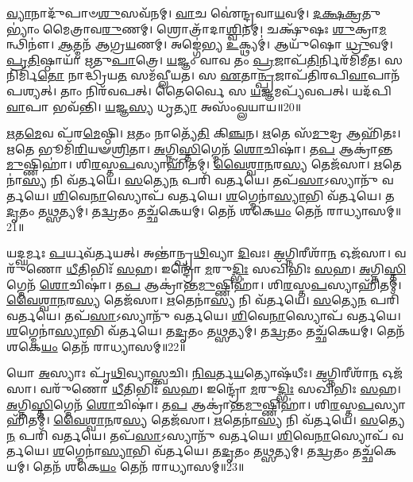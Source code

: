 \-\ul{𑌵𑍍𑌯𑌾}\-𑌨𑌾𑌦𑍁᳴𑌪𑌾𑍞\-\ul{𑌶𑍁}\-𑌸𑌵᳴𑌨𑌮𑍍।
\-\ul{𑌵𑌾}\-𑌚 𑌐॑𑌨𑍍𑌦𑍍𑌰𑌵𑌾\-\ul{𑌯}\-𑌵𑌮𑍍।
\-\ul{𑌦}\-\-\ul{𑌕𑍍𑌷}\-\-\ul{𑌕𑍍𑌰}\-𑌤𑍁𑌭𑍍𑌯𑌾𑌂॑ 𑌮𑍈𑌤𑍍𑌰𑌾𑌵\-\ul{𑌰𑍁}\-𑌣𑌮𑍍।
𑌶𑍍𑌰𑍋𑌤𑍍𑌰𑌾᳴𑌦𑌾\-\ul{𑌶𑍍𑌵𑌿}\-𑌨𑌮𑍍।
𑌚𑌕𑍍𑌷𑍁᳴𑌷𑌃 \ul{𑌶𑍁}\-𑌕𑍍𑌰𑌾\-\ul{𑌮}\-𑌨𑍍𑌥𑌿𑌨𑍗॑।
\-\ul{𑌆}\-𑌤𑍍𑌮𑌨᳴ 𑌆𑌗𑍍𑌰\-\ul{𑌯}\-𑌣𑌮𑍍।
𑌅𑌙𑍍𑌗𑍇॑𑌭𑍍𑌯 \ul{𑌉}\-𑌕𑍍𑌥𑍍𑌯𑌮𑍍॑।
𑌆𑌯𑍁᳴𑌷𑍋 \ul{𑌧𑍍𑌰𑍁}\-𑌵𑌮𑍍।
\-\ul{𑌪𑍍𑌰}\-\-\ul{𑌤𑌿}\-𑌷𑍍𑌠𑌾𑌯𑌾᳴ 𑌋𑌤𑍁\-\ul{𑌪𑌾}\-𑌤𑍍𑌰𑍇।
\-\ul{𑌯}\-𑌜𑍍𑌞𑌂 𑌵𑌾𑌵 𑌤𑌂 \ul{𑌪𑍍𑌰}\-𑌜𑌾𑌪᳴\-\ul{𑌤𑌿}\-𑌰𑍍𑌨𑌿𑌰᳴𑌮𑌿𑌮𑍀𑌤।
𑌸 𑌨𑌿𑌰𑍍𑌮𑌿᳴\-\ul{𑌤𑍋} 𑌨𑌾𑌦𑍍𑌧𑍍𑌰𑌿᳴𑌯\-\ul{𑌤} 𑌸𑌮᳴𑌵𑍍𑌲𑍀𑌯𑌤।
𑌸 \ul{𑌏}\-𑌤𑌾\-\ul{𑌨𑍍𑌪𑍍𑌰}\-𑌜𑌾𑌪᳴𑌤𑌿𑌰𑌪𑌿\-\ul{𑌵𑌾}\-𑌪𑌾𑌨᳴𑌪𑌶𑍍𑌯𑌤𑍍।
𑌤𑌾𑌂 𑌨𑌿𑌰᳴𑌵𑌪𑌤𑍍।
𑌤𑍈𑌰𑍍𑌵𑍈 𑌸 \ul{𑌯}\-𑌜𑍍𑌞𑌮𑌪𑍍𑌯᳴𑌵𑌪𑌤𑍍।
𑌯𑌦᳴𑌪𑌿\-\ul{𑌵𑌾}\-𑌪𑌾 𑌭𑌵᳴𑌨𑍍𑌤𑌿।
\-\ul{𑌯}\-𑌜𑍍𑌞\-\ul{𑌸𑍍𑌯} 𑌧𑍃\-\ul{𑌤𑍍𑌯𑌾} 𑌅𑌸𑌂᳴𑌵𑍍𑌲𑌯𑌾𑌯॥20॥\anuvakamend[\-\ul{𑌉}\-\-\ul{𑌪𑌾}\-\-\ul{𑍞}\-\-\ul{𑌶𑍍𑌵}\-\-\ul{𑌨𑍍𑌤}\-\-\ul{𑌰𑍍𑌯𑌾}\-𑌮𑍗 𑌨𑌿𑌰᳴𑌮𑌿𑌮𑍀𑌤𑌾𑌮𑌿𑌮𑍀\-\ul{𑌤} 𑌷𑌟𑍍𑌚᳴]

\-\ul{𑌋}\-𑌤\-\ul{𑌮𑍇}\-𑌵 𑌪᳴𑌰\-\ul{𑌮𑍇}\-𑌷𑍍𑌠𑌿।
\-\ul{𑌋}\-𑌤𑌂 𑌨𑌾𑌤𑍍𑌯𑍇᳴\-\ul{𑌤𑌿} 𑌕𑌿\-\ul{𑌞𑍍𑌚}\-𑌨।
\-\ul{𑌋}\-𑌤𑍇 𑌸᳴\-\ul{𑌮𑍁}\-𑌦𑍍𑌰 𑌆𑌹𑌿᳴𑌤𑌃।
\-\ul{𑌋}\-𑌤𑍇 𑌭𑍂𑌮𑌿᳴\-\ul{𑌰𑌿}\-𑌯𑍟\-\ul{𑌶𑍍𑌰𑌿}\-𑌤𑌾।
\-\ul{𑌅}\-𑌗𑍍𑌨𑌿\-\ul{𑌸𑍍𑌤𑌿}\-𑌗𑍍𑌮𑍇𑌨᳴ \ul{𑌶𑍋}\-𑌚𑌿𑌷𑌾॑।
𑌤\-\ul{𑌪} 𑌆𑌕𑍍𑌰𑌾॑𑌨𑍍𑌤\-\ul{𑌮𑍁}\-𑌷𑍍𑌣𑌿𑌹𑌾॑।
𑌶𑌿\-\ul{𑌰}\-𑌸𑍍𑌤\-\ul{𑌪}\-𑌸𑍍𑌯𑌾𑌹𑌿᳴𑌤𑌮𑍍।
\-\ul{𑌵𑍈}\-\-\ul{𑌶𑍍𑌵𑌾}\-\-\ul{𑌨}\-𑌰\-\ul{𑌸𑍍𑌯} 𑌤𑍇𑌜᳴𑌸𑌾।
\-\ul{𑌋}\-𑌤𑍇𑌨𑌾॑\-\ul{𑌸𑍍𑌯} 𑌨𑌿 𑌵᳴𑌰𑍍𑌤𑌯𑍇।
\-\ul{𑌸}\-𑌤𑍍𑌯𑍇\-\ul{𑌨} 𑌪𑌰𑌿᳴ 𑌵𑌰𑍍𑌤𑌯𑍇।
𑌤𑌪᳴\-\ul{𑌸𑌾}\-\-𑌽𑌸𑍍𑌯𑌾𑌨𑍁᳴ 𑌵𑌰𑍍𑌤𑌯𑍇।
\-\ul{𑌶𑌿}\-𑌵𑍇\-\ul{𑌨𑌾}\-𑌸𑍍𑌯𑍋𑌪᳴ 𑌵𑌰𑍍𑌤𑌯𑍇।
\-\ul{𑌶}\-𑌗𑍍𑌮𑍇𑌨𑌾॑\-\ul{𑌸𑍍𑌯𑌾}\-𑌭𑌿 𑌵᳴𑌰𑍍𑌤𑌯𑍇।
𑌤\-\ul{𑌦𑍃}\-𑌤𑌂 𑌤\-\ul{𑌥𑍍𑌸}\-𑌤𑍍𑌯𑌮𑍍।
𑌤\-\ul{𑌦𑍍𑌵𑍍𑌰}\-𑌤𑌂 𑌤𑌚𑍍𑌛᳴𑌕𑍇𑌯𑌮𑍍।
𑌤𑍇𑌨᳴ 𑌶𑌕𑍇\-\ul{𑌯𑌂} 𑌤𑍇𑌨᳴ 𑌰𑌾𑌧𑍍𑌯𑌾𑌸𑌮𑍍॥21॥

𑌯𑌦𑍍\mbox{}\-\ul{𑌘}\-𑌰𑍍𑌮𑌃 \ul{𑌪}\-𑌰𑍍𑌯𑌵᳴𑌰𑍍𑌤𑌯𑌤𑍍।
𑌅𑌨𑍍𑌤𑌾॑𑌨𑍍𑌪𑍃\-\ul{𑌥𑌿}\-𑌵𑍍𑌯𑌾 \ul{𑌦𑌿}\-𑌵𑌃।
\-\ul{𑌅}\-𑌗𑍍𑌨𑌿𑌰𑍀𑌶𑌾᳴\-\ul{𑌨} 𑌓𑌜᳴𑌸𑌾।
𑌵𑌰𑍁᳴𑌣𑍋 \ul{𑌧𑍀}\-𑌤𑌿𑌭𑌿𑌃᳴ \ul{𑌸}\-𑌹।
𑌇𑌨𑍍𑌦𑍍𑌰𑍋᳴ \ul{𑌮}\-𑌰𑍁\-\ul{𑌦𑍍𑌭𑌿𑌃} 𑌸𑌖𑌿᳴𑌭𑌿𑌃 \ul{𑌸}\-𑌹।
\-\ul{𑌅}\-𑌗𑍍𑌨𑌿\-\ul{𑌸𑍍𑌤𑌿}\-𑌗𑍍𑌮𑍇𑌨᳴ \ul{𑌶𑍋}\-𑌚𑌿𑌷𑌾॑।
𑌤\-\ul{𑌪} 𑌆𑌕𑍍𑌰𑌾॑𑌨𑍍𑌤\-\ul{𑌮𑍁}\-𑌷𑍍𑌣𑌿𑌹𑌾॑।
𑌶𑌿\-\ul{𑌰}\-𑌸𑍍𑌤\-\ul{𑌪}\-𑌸𑍍𑌯𑌾𑌹𑌿᳴𑌤𑌮𑍍।
\-\ul{𑌵𑍈}\-\-\ul{𑌶𑍍𑌵𑌾}\-\-\ul{𑌨}\-𑌰\-\ul{𑌸𑍍𑌯} 𑌤𑍇𑌜᳴𑌸𑌾।
\-\ul{𑌋}\-𑌤𑍇𑌨𑌾॑\-\ul{𑌸𑍍𑌯} 𑌨𑌿 𑌵᳴𑌰𑍍𑌤𑌯𑍇।
\-\ul{𑌸}\-𑌤𑍍𑌯𑍇\-\ul{𑌨} 𑌪𑌰𑌿᳴ 𑌵𑌰𑍍𑌤𑌯𑍇।
𑌤𑌪᳴\-\ul{𑌸𑌾}\-\-𑌽𑌸𑍍𑌯𑌾𑌨𑍁᳴ 𑌵𑌰𑍍𑌤𑌯𑍇।
\-\ul{𑌶𑌿}\-𑌵𑍇\-\ul{𑌨𑌾}\-𑌸𑍍𑌯𑍋𑌪᳴ 𑌵𑌰𑍍𑌤𑌯𑍇।
\-\ul{𑌶}\-𑌗𑍍𑌮𑍇𑌨𑌾॑\-\ul{𑌸𑍍𑌯𑌾}\-𑌭𑌿 𑌵᳴𑌰𑍍𑌤𑌯𑍇।
𑌤\-\ul{𑌦𑍃}\-𑌤𑌂 𑌤\-\ul{𑌥𑍍𑌸}\-𑌤𑍍𑌯𑌮𑍍।
𑌤\-\ul{𑌦𑍍𑌵𑍍𑌰}\-𑌤𑌂 𑌤𑌚𑍍𑌛᳴𑌕𑍇𑌯𑌮𑍍।
𑌤𑍇𑌨᳴ 𑌶𑌕𑍇\-\ul{𑌯𑌂} 𑌤𑍇𑌨᳴ 𑌰𑌾𑌧𑍍𑌯𑌾𑌸𑌮𑍍॥22॥

𑌯𑍋 \ul{𑌅}\-𑌸𑍍𑌯𑌾𑌃 𑌪𑍃᳴\-\ul{𑌥𑌿}\-𑌵𑍍𑌯𑌾\-\ul{𑌸𑍍𑌤𑍍𑌵}\-𑌚𑌿।
\-\ul{𑌨𑌿}\-\-\ul{𑌵}\-𑌰𑍍𑌤\-\ul{𑌯}\-𑌤𑍍𑌯𑍋𑌷᳴𑌧𑍀𑌃।
\-\ul{𑌅}\-𑌗𑍍𑌨𑌿𑌰𑍀𑌶𑌾᳴\-\ul{𑌨} 𑌓𑌜᳴𑌸𑌾।
𑌵𑌰𑍁᳴𑌣𑍋 \ul{𑌧𑍀}\-𑌤𑌿𑌭𑌿𑌃᳴ \ul{𑌸}\-𑌹।
𑌇𑌨𑍍𑌦𑍍𑌰𑍋᳴ \ul{𑌮}\-𑌰𑍁\-\ul{𑌦𑍍𑌭𑌿𑌃} 𑌸𑌖𑌿᳴𑌭𑌿𑌃 \ul{𑌸}\-𑌹।
\-\ul{𑌅}\-𑌗𑍍𑌨𑌿\-\ul{𑌸𑍍𑌤𑌿}\-𑌗𑍍𑌮𑍇𑌨᳴ \ul{𑌶𑍋}\-𑌚𑌿𑌷𑌾॑।
𑌤\-\ul{𑌪} 𑌆𑌕𑍍𑌰𑌾॑𑌨𑍍𑌤\-\ul{𑌮𑍁}\-𑌷𑍍𑌣𑌿𑌹𑌾॑।
𑌶𑌿\-\ul{𑌰}\-𑌸𑍍𑌤\-\ul{𑌪}\-𑌸𑍍𑌯𑌾𑌹𑌿᳴𑌤𑌮𑍍।
\-\ul{𑌵𑍈}\-\-\ul{𑌶𑍍𑌵𑌾}\-\-\ul{𑌨}\-𑌰\-\ul{𑌸𑍍𑌯} 𑌤𑍇𑌜᳴𑌸𑌾।
\-\ul{𑌋}\-𑌤𑍇𑌨𑌾॑\-\ul{𑌸𑍍𑌯} 𑌨𑌿 𑌵᳴𑌰𑍍𑌤𑌯𑍇।
\-\ul{𑌸}\-𑌤𑍍𑌯𑍇\-\ul{𑌨} 𑌪𑌰𑌿᳴ 𑌵𑌰𑍍𑌤𑌯𑍇।
𑌤𑌪᳴\-\ul{𑌸𑌾}\-\-𑌽𑌸𑍍𑌯𑌾𑌨𑍁᳴ 𑌵𑌰𑍍𑌤𑌯𑍇।
\-\ul{𑌶𑌿}\-𑌵𑍇\-\ul{𑌨𑌾}\-𑌸𑍍𑌯𑍋𑌪᳴ 𑌵𑌰𑍍𑌤𑌯𑍇।
\-\ul{𑌶}\-𑌗𑍍𑌮𑍇𑌨𑌾॑\-\ul{𑌸𑍍𑌯𑌾}\-𑌭𑌿 𑌵᳴𑌰𑍍𑌤𑌯𑍇।
𑌤\-\ul{𑌦𑍃}\-𑌤𑌂 𑌤\-\ul{𑌥𑍍𑌸}\-𑌤𑍍𑌯𑌮𑍍।
𑌤\-\ul{𑌦𑍍𑌵𑍍𑌰}\-𑌤𑌂 𑌤𑌚𑍍𑌛᳴𑌕𑍇𑌯𑌮𑍍।
𑌤𑍇𑌨᳴ 𑌶𑌕𑍇\-\ul{𑌯𑌂} 𑌤𑍇𑌨᳴ 𑌰𑌾𑌧𑍍𑌯𑌾𑌸𑌮𑍍॥23॥

